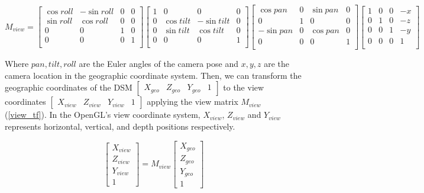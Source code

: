 \documentclass{article}
\begin{document}
\begin{equation}
\label{view_matrix}
  M_{view} = 
  \begin{bmatrix}
    \cos roll & -\sin roll & 0 & 0 \\
    \sin roll & \cos roll & 0 & 0 \\
    0 & 0 & 1 & 0 \\
    0 & 0 & 0 & 1 \\
  \end{bmatrix}
  \begin{bmatrix}
    1 & 0 & 0 & 0 \\
    0 & \cos tilt & -\sin tilt & 0 \\
    0 & \sin tilt & \cos tilt & 0 \\
    0 & 0 & 0 & 1 \\
  \end{bmatrix}
  \begin{bmatrix}
    \cos pan & 0 & \sin pan & 0 \\
    0 & 1 & 0 & 0 \\
    -\sin pan & 0 & \cos pan & 0 \\
    0 & 0 & 0 & 1 \\
  \end{bmatrix}
  \begin{bmatrix}
    1 & 0 & 0 & -x \\
    0 & 1 & 0 & -z \\
    0 & 0 & 1 & -y \\
    0& 0 & 0 & 1 \\
  \end{bmatrix}
\end{equation}

Where \(pan, tilt, roll\) are the Euler angles of the camera pose and \(x, y, z\) are the camera location in the geographic coordinate system. Then, we can transform the geographic coordinates of the DSM \(\begin{bmatrix} X_{geo} & Z_{geo} & Y_{geo} & 1 \end{bmatrix}\) to the view coordinates \(\begin{bmatrix} X_{view} & Z_{view} & Y_{view} & 1 \end{bmatrix}\) applying the view matrix \(M_{view}\) (\ref{view_tf}). In the OpenGL's view coordinate system, \(X_{view}\), \(Z_{view}\) and \(Y_{view}\) represents horizontal, vertical, and depth positions respectively.

\begin{equation}
\label{view_tf}
  \begin{bmatrix} 
    X_{view} \\ Z_{view} \\ Y_{view} \\ 1 
  \end{bmatrix}
  =
  M_{view}
  \begin{bmatrix} 
    X_{geo} \\ Z_{geo} \\ Y_{geo} \\ 1 
  \end{bmatrix}
\end{equation}
\end{document}
